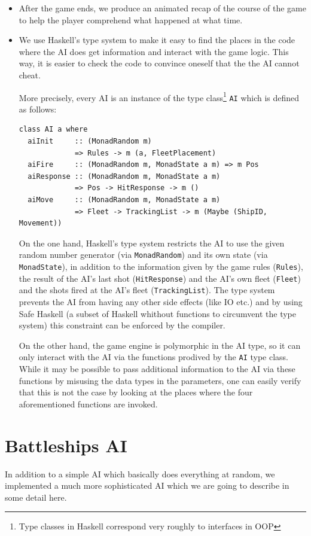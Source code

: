 \documentclass[a4paper]{easychair}
\begin{document}
\begin{itemize}
\item After the game ends, we produce an animated recap of the course of the game to help the player comprehend what happened at what time. 
\item We use Haskell's type system to make it easy to find the places in the code where the AI does get information and interact with the game logic. This way, it is easier to check the code to convince oneself that the the AI cannot cheat.
  
More precisely, every AI is an instance of the type class\footnote{Type classes in Haskell correspond very roughly to interfaces in OOP} \verb+AI+ which is defined as follows:

\begin{verbatim}
class AI a where
  aiInit     :: (MonadRandom m) 
             => Rules -> m (a, FleetPlacement)
  aiFire     :: (MonadRandom m, MonadState a m) => m Pos
  aiResponse :: (MonadRandom m, MonadState a m) 
             => Pos -> HitResponse -> m ()
  aiMove     :: (MonadRandom m, MonadState a m)
             => Fleet -> TrackingList -> m (Maybe (ShipID, Movement))
\end{verbatim}

On the one hand, Haskell's type system restricts the AI to use the given random number generator (via \verb|MonadRandom|) and its own state (via \verb|MonadState|), in addition to the information given by the game rules (\verb|Rules|), the result of the AI's last shot (\verb|HitResponse|) and the AI's own fleet (\verb|Fleet|) and the shots fired at the AI's fleet (\verb|TrackingList|).
The type system prevents the AI from having any other side effects (like IO etc.) and by using Safe Haskell (a subset of Haskell whithout functions to circumvent the type system) this constraint can be enforced by the compiler.

On the other hand, the game engine is polymorphic in the AI type, so it can only interact with the AI via the functions prodived by the \verb|AI| type class. While it may be possible to pass additional information to the AI via these functions by misusing the data types in the parameters, one can easily verify that this is not the case by looking at the places where the four aforementioned functions are invoked.

\end{itemize}

\section{Battleships AI}
\label{sect:battleships-ai}
In addition to a simple AI which basically does everything at random, we implemented a much more sophisticated AI which we are going to describe in some detail here.
\end{document}
